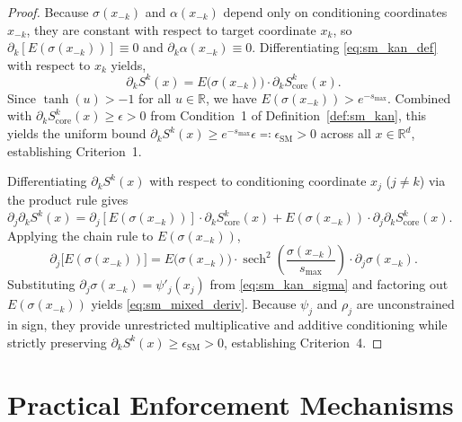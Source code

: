 \documentclass[11pt,a4paper]{article}
\theoremstyle{plain}
\theoremstyle{definition}
\theoremstyle{remark}
\begin{document}
\begin{proof}
Because $\sigma(x_{-k})$ and $\alpha(x_{-k})$ depend only on conditioning coordinates $x_{-k}$, they are constant with respect to target coordinate $x_k$, so $\partial_k [E(\sigma(x_{-k}))] \equiv 0$ and $\partial_k \alpha(x_{-k}) \equiv 0$. Differentiating \eqref{eq:sm_kan_def} with respect to $x_k$ yields,
\begin{equation}
    \partial_k S^k(x) = E\big(\sigma(x_{-k})\big) \cdot \partial_k S^k_{\text{core}}(x).
\end{equation}
Since $\tanh(u) > -1$ for all $u \in \mathbb{R}$, we have $E(\sigma(x_{-k})) > e^{-s_{\max}}$. Combined with $\partial_k S^k_{\text{core}}(x) \ge \epsilon > 0$ from Condition~1 of Definition~\ref{def:sm_kan}, this yields the uniform bound $\partial_k S^k(x) \ge e^{-s_{\max}} \epsilon \eqqcolon \epsilon_{\text{SM}} > 0$ across all $x \in \mathbb{R}^d$, establishing Criterion~1.

Differentiating $\partial_k S^k(x)$ with respect to conditioning coordinate $x_j$ ($j \neq k$) via the product rule gives $\partial_j \partial_k S^k(x) = \partial_j [E(\sigma(x_{-k}))] \cdot \partial_k S^k_{\text{core}}(x) + E(\sigma(x_{-k})) \cdot \partial_j \partial_k S^k_{\text{core}}(x)$. Applying the chain rule to $E(\sigma(x_{-k}))$,
\begin{equation}
    \partial_j \big[ E(\sigma(x_{-k})) \big] = E\big(\sigma(x_{-k})\big) \cdot \operatorname{sech}^2\left(\frac{\sigma(x_{-k})}{s_{\max}}\right) \cdot \partial_j \sigma(x_{-k}).
\end{equation}
Substituting $\partial_j \sigma(x_{-k}) = \psi'_j(x_j)$ from \eqref{eq:sm_kan_sigma} and factoring out $E(\sigma(x_{-k}))$ yields \eqref{eq:sm_mixed_deriv}. Because $\psi_j$ and $\rho_j$ are unconstrained in sign, they provide unrestricted multiplicative and additive conditioning while strictly preserving $\partial_k S^k(x) \ge \epsilon_{\text{SM}} > 0$, establishing Criterion~4.
\end{proof}
\section{Practical Enforcement Mechanisms}
\label{sec:practical_enforcement}
\end{document}
